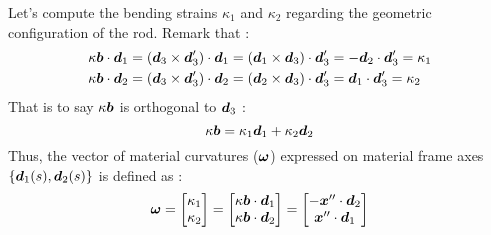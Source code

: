 Let’s compute the bending strains $\kappa_1$ and $\kappa_2$ regarding the geometric configuration of the rod. Remark that :
\begin{equation}
	\begin{aligned}
	&\kappa\boldsymbol{b}\cdot\boldsymbol{d}_1 = (\boldsymbol{d}_3\times\boldsymbol{d}'_3)\cdot\boldsymbol{d}_1 = (\boldsymbol{d}_1\times\boldsymbol{d}_3)\cdot\boldsymbol{d}'_3 = -\boldsymbol{d}_2\cdot\boldsymbol{d}'_3 = \kappa_1 \\
	&\kappa\boldsymbol{b}\cdot\boldsymbol{d}_2 = (\boldsymbol{d}_3\times\boldsymbol{d}'_3)\cdot\boldsymbol{d}_2 = (\boldsymbol{d}_2\times\boldsymbol{d}_3)\cdot\boldsymbol{d}'_3 = \boldsymbol{d}_1\cdot\boldsymbol{d}'_3 = \kappa_2	
	\end{aligned}
\end{equation}
That is to say $\kappa\boldsymbol{b}$ is orthogonal to $\boldsymbol{d}_3$ :
\begin{equation}
	\kappa\boldsymbol{b} = \kappa_1\boldsymbol{d}_1 +   \kappa_2\boldsymbol{d}_2
\end{equation}
Thus, the vector of material curvatures ($\boldsymbol{\omega}$) expressed on material frame axes $\{\boldsymbol{d}_1(s),\boldsymbol{d}_2(s)\}$ is defined as :
\begin{equation}
	\boldsymbol{\omega} =
	\begin{bmatrix}
		\kappa_1\\
		\kappa_2\\
	\end{bmatrix} =
	\begin{bmatrix}
		\kappa\boldsymbol{b}\cdot\boldsymbol{d}_1\\
		\kappa\boldsymbol{b}\cdot\boldsymbol{d}_2\\
	\end{bmatrix} =
		\begin{bmatrix}
		-\boldsymbol{x}''\cdot\boldsymbol{d}_2\\
		\boldsymbol{x}''\cdot\boldsymbol{d}_1\\
	\end{bmatrix}
\end{equation}

